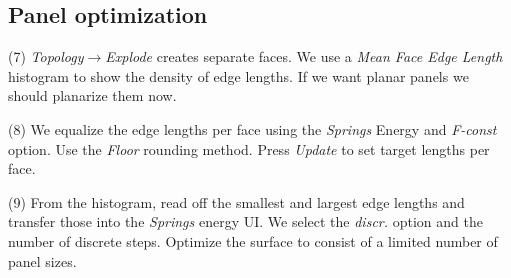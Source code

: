 \documentclass[Thesis.tex]{subfiles}
\begin{document}
\subsection{Panel optimization}

\begin{compactenum}[(1)]
\item[(7)] \emph{Topology$\to$Explode} creates separate faces. We use a \emph{Mean Face Edge Length} histogram to show the density of edge lengths. If we want planar panels we should planarize them now.

\begin{center}
\begin{minipage}{0.9\linewidth}
            \centering
\end{minipage}
\end{center}

\item[(8)] We equalize the edge lengths per face using the \emph{Springs} Energy and \emph{F-const} option. Use the \emph{Floor} rounding method. Press \emph{Update} to set target lengths per face.

\begin{center}
\begin{minipage}{0.9\linewidth}
            \centering
\end{minipage}
\end{center}
\item[(9)] From the histogram, read off the smallest and largest edge lengths and transfer those into the \emph{Springs} energy UI. We select the \emph{discr.} option and the number of discrete steps. Optimize the surface to consist of a limited number of panel sizes.

\begin{center}
\begin{minipage}{0.9\linewidth}
            \centering
\end{minipage}
\end{center}            
\end{compactenum}
\end{document}
